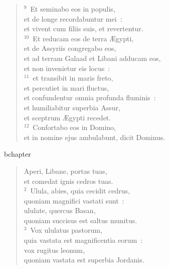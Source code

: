 \begin{verse}
${}^{9}$~Et seminabo eos in populis,\\ et de longe recordabuntur mei~:\\ et vivent cum filiis suis, et revertentur.\\
${}^{10}$~Et reducam eos de terra \AE gypti,\\ et de Assyriis congregabo eos,\\ et ad terram Galaad et Libani adducam eos,\\ et non invenietur eis locus~:\\
${}^{11}$~et transibit in maris freto,\\ et percutiet in mari fluctus,\\ et confundentur omnia profunda fluminis~:\\ et humiliabitur superbia Assur,\\ et sceptrum \AE gypti recedet.\\
${}^{12}$~Confortabo eos in Domino,\\ et in nomine ejus ambulabunt, dicit Dominus.\end{verse}


bchapter\begin{verse}\vspace{-19pt}Aperi, Libane, portas tuas,\\ et comedat ignis cedros tuas.\\
${}^{2}$~Ulula, abies, quia cecidit cedrus,\\ quoniam magnifici vastati sunt~:\\ ululate, quercus Basan,\\ quoniam succisus est saltus munitus.\\
${}^{3}$~Vox ululatus pastorum,\\ quia vastata est magnificentia eorum~:\\ vox rugitus leonum,\\ quoniam vastata est superbia Jordanis.\end{verse}


